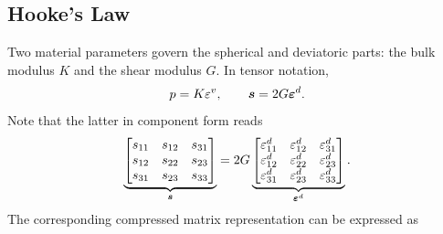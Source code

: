 \subsection{Hooke's Law}
Two material parameters govern the spherical and deviatoric parts: the bulk modulus $K$ and the shear modulus $G$.
In tensor notation,
\begin{gather}
p=K\varepsilon^v,\qquad\bm{s}=2G\bm{\varepsilon}^d.
\end{gather}
Note that the latter in component form reads
\begin{gather}
\underbrace{\begin{bmatrix}
s_{11}&s_{12}&s_{31}\\
s_{12}&s_{22}&s_{23}\\
s_{31}&s_{23}&s_{33}
\end{bmatrix}}_{\bm{s}}
=
2G
\underbrace{\begin{bmatrix}
\varepsilon^d_{11}&\varepsilon^d_{12}&\varepsilon^d_{31}\\
\varepsilon^d_{12}&\varepsilon^d_{22}&\varepsilon^d_{23}\\
\varepsilon^d_{31}&\varepsilon^d_{23}&\varepsilon^d_{33}
\end{bmatrix}}_{\bm{\varepsilon}^d}.
\end{gather}
The corresponding compressed matrix representation can be expressed as
